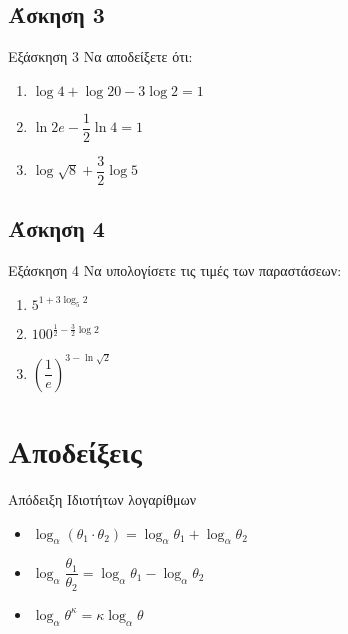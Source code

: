 \documentclass[greek]{beamer}
\begin{document}
\subsection{Άσκηση 3}
\begin{frame}[label=Άσκηση3,t]{Εξάσκηση 3}
 Να αποδείξετε ότι:
 \begin{enumerate}
  \item<1-> $\log 4+\log 20-3\log 2=1$
  \item<2-> $\ln 2e-\dfrac{1}{2}\ln 4=1$
  \item<3-> $\log\sqrt{8}+\dfrac{3}{2}\log 5$
 \end{enumerate}

\end{frame}

\subsection{Άσκηση 4}
\begin{frame}[label=Άσκηση4,t]{Εξάσκηση 4}
 Να υπολογίσετε τις τιμές των παραστάσεων:
 \begin{enumerate}
  \item<1-> $5^{1+3\log_5 2}$
  \item<2-> $100^{\frac{1}{2}-\frac{3}{2}\log 2}$
  \item<3-> $\left( \dfrac{1}{e} \right)^{3-\ln \sqrt{2}} $
 \end{enumerate}

\end{frame}

\appendix

\section{Αποδείξεις}
\begin{frame}[label=Απόδειξη1,t]{Απόδειξη Ιδιοτήτων λογαρίθμων}

 \begin{itemize}
  \item<1-> $\log_α\left( θ_1\cdot θ_2 \right)=\log_αθ_1+\log_αθ_2 $
  \item<3-> $\log_α\dfrac{θ_1}{θ_2}=\log_αθ_1-\log_αθ_2 $
  \item<4-> $\log_αθ^κ=κ\log_αθ$
 \end{itemize}



 \hyperlink{Ιδιότητες}{}
\end{frame}
\end{document}
